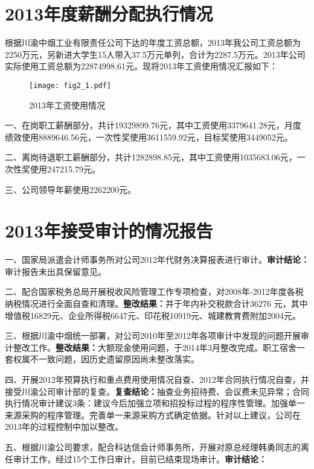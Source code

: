 


\section{2013年度薪酬分配执行情况}

\indent
根据川渝中烟工业有限责任公司下达的年度工资总额，2013年我公司工资总额为2250万元，另新进大学生15人带入37.5万元单列，合计为2287.5万元。2013年公司实际使用工资总额为22874998.61元。现将2013年工资使用情况汇报如下：

\begin{figure}[!htbp]
  \centering
  \texttt{[image: fig2\_1.pdf]}
  \caption{2013年工资使用情况}
  \label{figure2-1}
\end{figure}


一、在岗职工薪酬部分，共计19329899.76元，其中工资使用3379641.28元，月度绩效使用8889646.56元，一次性奖使用3611559.92元，目标奖使用3449052元。

二、离岗待退职工薪酬部分，共计1282898.85元，其中工资使用1035683.06元，一次性奖使用247215.79元。

三、公司领导年薪使用2262200元。







\section{2013年接受审计的情况报告}

一、国家局派遣会计师事务所对公司2012年代财务决算报表进行审计。\textbf{审计结论：}审计报告未出具保留意见。


二、配合国家税务总局开展税收风险管理工作专项检查，对2008年-2012年度各税纳税情况进行全面自查和清理。\textbf{整改结果：}并于年内补交税款合计36276 元，其中增值税16829元、企业所得税6647元、印花税10919元、城建教育费附加2004元。

三、根据川渝中烟统一部署，对公司2010年至2012年各项审计中发现的问题开展审计整改工作。\textbf{整改结果：}大额现金使用问题，于2014年3月整改完成。职工宿舍一套权属不一致问题，因历史遗留原因尚未整改落实。


四、开展2012年预算执行和重点费用使用情况自查、2012年合同执行情况自查，并接受川渝公司审计部的复查。\textbf{复查结论：}抽查业务招待费、会议费未见异常；合同执行情况审计建议3条：建议今后加强立项和招投标过程的程序性管理。加强单一来源采购的程序管理。完善单一来源采购方式确定依据。针对以上建议，公司在2013年的过程控制中加以整改。


五、根据川渝公司要求，配合科达信会计师事务所，开展对原总经理韩勇同志的离任审计工作，经过15个工作日审计，目前已结束现场审计。\textbf{审计结论：}


